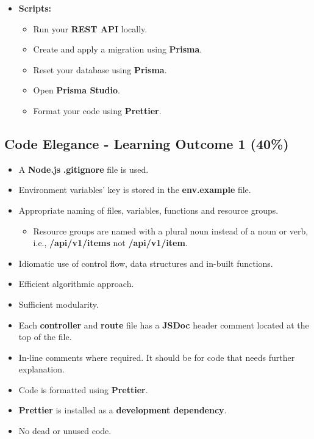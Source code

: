 \documentclass{article}
\begin{document}
\begin{itemize}
	\item \textbf{Scripts:}
	\begin{itemize}
		\item Run your \textbf{REST API} locally.
		\item Create and apply a migration using \textbf{Prisma}.
		\item Reset your database using \textbf{Prisma}.
		\item Open \textbf{Prisma Studio}. 
		\item Format your code using \textbf{Prettier}.
	\end{itemize}
\end{itemize}

\subsection*{Code Elegance - Learning Outcome 1 (40\%)}
\begin{itemize}
	\item A \textbf{Node.js} \textbf{.gitignore} file is used.
	\item Environment variables' key is stored in the \textbf{env.example} file. 
  \item Appropriate naming of files, variables, functions and resource groups.
  \begin{itemize}
	\item Resource groups are named with a plural noun instead of a noun or verb, i.e., \textbf{/api/v1/items} not \textbf{/api/v1/item}.
  \end{itemize}
	\item Idiomatic use of control flow, data structures and in-built functions.
  \item Efficient algorithmic approach.
  \item Sufficient modularity.
  \item Each \textbf{controller} and \textbf{route} file has a \textbf{JSDoc} header comment located at the top of the file.
\item In-line comments where required. It should be for code that needs further explanation.
  \item Code is formatted using \textbf{Prettier}.
  \item \textbf{Prettier} is installed as a \textbf{development dependency}.	
\item No dead or unused code. 
\end{itemize}
\end{document}
